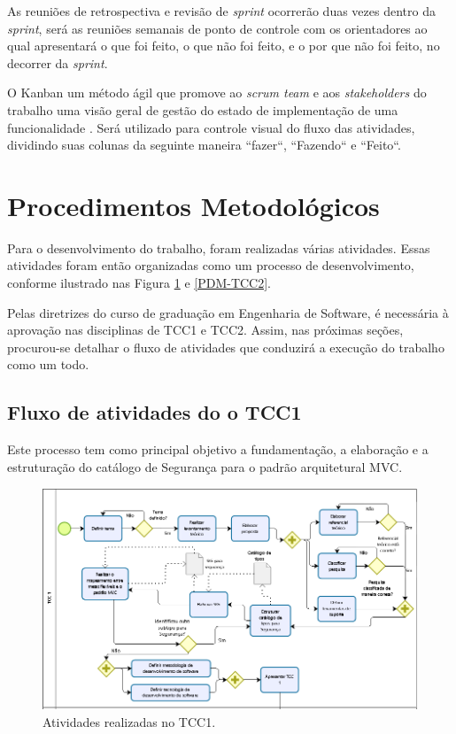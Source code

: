 As reuniões de retrospectiva e revisão de \textit{sprint} ocorrerão duas vezes dentro da \textit{sprint}, será as reuniões semanais   de ponto de controle com os orientadores ao qual apresentará o que foi feito, o que não foi feito, e o por que não foi feito, no decorrer da \textit{sprint}. 

O Kanban um método ágil que promove ao \textit{scrum team} e aos \textit{stakeholders} do trabalho uma visão geral de gestão do estado de implementação de uma funcionalidade \cite{prikladnicki2014metodos}. Será utilizado para controle visual do fluxo das atividades, dividindo suas colunas da seguinte maneira ``fazer``, ``Fazendo`` e ``Feito``.

\section{Procedimentos Metodológicos}
\label{sec:procedimentosMetodológicos}

Para o desenvolvimento do trabalho, foram realizadas várias atividades. Essas atividades foram então organizadas como um processo de desenvolvimento, conforme ilustrado nas Figura \ref{PDM-TCC1} e \ref{PDM-TCC2}. 

Pelas diretrizes do curso de graduação em Engenharia de Software, é necessária à aprovação nas disciplinas de TCC1 e TCC2. Assim, nas próximas seções, procurou-se detalhar o fluxo de atividades que conduzirá a execução do trabalho como um todo. 

\subsection{Fluxo de atividades do o TCC1}

Este processo tem como principal objetivo a fundamentação, a elaboração e a estruturação do catálogo de Segurança para o padrão arquitetural MVC. 

\begin{figure}[h!]
	\centering
	\includegraphics[keepaspectratio=true,scale=0.6]{figuras/PDM-TCC1.PNG}
	\caption{Atividades realizadas no TCC1.}
	\label{PDM-TCC1}
\end{figure}

